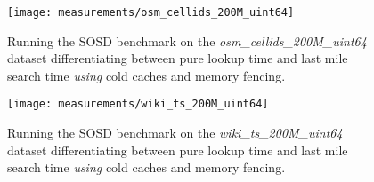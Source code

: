 \begin{figure}[ht]
  \centering
  \texttt{[image: measurements/osm\_cellids\_200M\_uint64]}
  \caption[Lookup and last mile search time measures using cold caches and memory fencing]{
    Running the SOSD benchmark on the \emph{osm\_cellids\_200M\_uint64} dataset differentiating between pure lookup time and last mile search time \emph{using} cold caches and memory fencing.
  }
\end{figure}

\begin{figure}[ht]
  \centering
  \texttt{[image: measurements/wiki\_ts\_200M\_uint64]}
  \caption[Lookup and last mile search time measures using cold caches and memory fencing]{
    Running the SOSD benchmark on the \emph{wiki\_ts\_200M\_uint64} dataset differentiating between pure lookup time and last mile search time \emph{using} cold caches and memory fencing.
  }
\end{figure}
